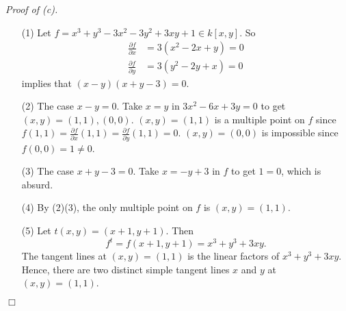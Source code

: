 \documentclass{article}
\begin{document}
\emph{Proof of (c).}
\begin{enumerate}
\item[(1)]
  Let $f = x^3 + y^3 - 3x^2 - 3y^2 + 3xy + 1 \in k[x,y]$.
  So
  \begin{align*}
    \frac{\partial f}{\partial x} &= 3(x^2 - 2x + y) = 0 \\
    \frac{\partial f}{\partial y} &= 3(y^2 - 2y + x) = 0
  \end{align*}
  implies that $(x-y)(x+y-3) = 0$.

\item[(2)]
  The case $x-y = 0$. Take $x = y$ in $3x^2 - 6x + 3y = 0$ to get
  $(x,y) = (1,1), (0,0)$.
  $(x,y) = (1,1)$ is a multiple point on $f$ since
  $f(1,1) = \frac{\partial f}{\partial x}(1,1) = \frac{\partial f}{\partial y}(1,1) = 0$.
  $(x,y) = (0,0)$ is impossible since $f(0,0) = 1 \neq 0$.

\item[(3)]
  The case $x+y-3 = 0$. Take $x = -y + 3$ in $f$ to get $1 = 0$, which is absurd.

\item[(4)]
  By (2)(3), the only multiple point on $f$ is $(x,y) = (1,1)$.

\item[(5)]
  Let $t(x,y) = (x+1,y+1)$.
  Then
  \[
    f^{t} = f(x+1,y+1) = x^3 + y^3 + 3xy.
  \]
  The tangent lines at $(x,y) = (1,1)$ is the linear factors of
  $x^3 + y^3 + 3xy$.
  Hence, there are two distinct simple tangent lines $x$ and $y$ at $(x,y) = (1,1)$.
  \end{enumerate}
$\Box$ \\
\end{document}
